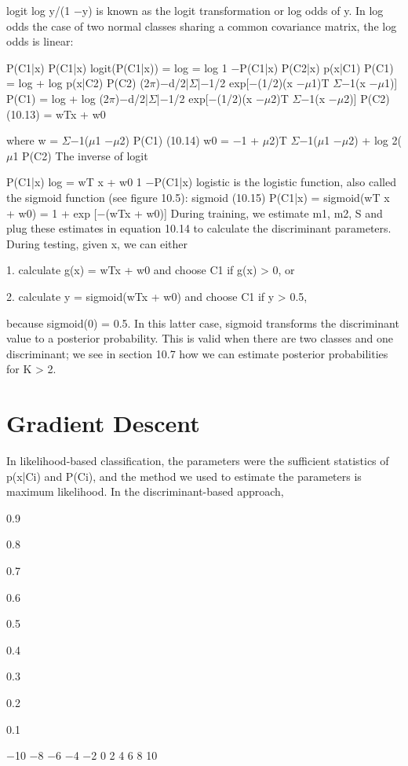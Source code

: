 logit log y/(1 $-$y) is known as the logit transformation or log odds of y. In log odds the case of two normal classes sharing a common covariance matrix, the log odds is linear:

P(C1|x) P(C1|x) logit(P(C1|x)) = log = log 1 $-$P(C1|x) P(C2|x) p(x|C1) P(C1) = log + log p(x|C2) P(C2) (2$\pi$)$-$d/2|$\Sigma$|$-$1/2 exp[$-$(1/2)(x $-$$\mu$1)T $\Sigma$$-$1(x $-$$\mu$1)] P(C1) = log + log (2$\pi$)$-$d/2|$\Sigma$|$-$1/2 exp[$-$(1/2)(x $-$$\mu$2)T $\Sigma$$-$1(x $-$$\mu$2)] P(C2) (10.13) = wTx + w0

where w = $\Sigma$$-$1($\mu$1 $-$$\mu$2) P(C1) (10.14) w0 = $-$1 + $\mu$2)T $\Sigma$$-$1($\mu$1 $-$$\mu$2) + log 2($\mu$1 P(C2) The inverse of logit

P(C1|x) log = wT x + w0 1 $-$P(C1|x) logistic is the logistic function, also called the sigmoid function (see figure 10.5): sigmoid (10.15) P(C1|x) = sigmoid(wT x + w0) = 1 + exp [$-$(wTx + w0)] During training, we estimate m1, m2, S and plug these estimates in equation 10.14 to calculate the discriminant parameters. During testing, given x, we can either

1. calculate g(x) = wTx + w0 and choose C1 if g(x) > 0, or

2. calculate y = sigmoid(wTx + w0) and choose C1 if y > 0.5,

because sigmoid(0) = 0.5. In this latter case, sigmoid transforms the discriminant value to a posterior probability. This is valid when there are two classes and one discriminant; we see in section 10.7 how we can estimate posterior probabilities for K > 2.

\section{Gradient Descent}

In likelihood-based classification, the parameters were the sufficient statistics of p(x|Ci) and P(Ci), and the method we used to estimate the parameters is maximum likelihood. In the discriminant-based approach,

0.9

0.8

0.7

0.6

0.5

0.4

0.3

0.2

0.1

$-$10 $-$8 $-$6 $-$4 $-$2 0 2 4 6 8 10

